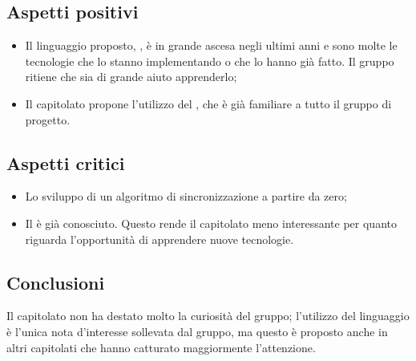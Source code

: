 \subsection{Aspetti positivi}
\begin{itemize}
\item Il linguaggio proposto, , è in grande ascesa negli ultimi anni e sono molte le tecnologie che lo stanno implementando o che lo hanno già fatto. Il gruppo ritiene che sia di grande aiuto apprenderlo;
\item Il capitolato propone l'utilizzo del  , che è già familiare a tutto il gruppo di progetto.
\end{itemize}

\subsection{Aspetti critici}
\begin{itemize}
\item Lo sviluppo di un algoritmo di sincronizzazione a partire da zero;
\item Il   è già conosciuto. Questo rende il capitolato meno interessante per quanto riguarda l'opportunità di apprendere nuove tecnologie.
\end{itemize}

\subsection{Conclusioni}
Il capitolato non ha destato molto la curiosità del gruppo; l'utilizzo del linguaggio  è l'unica nota d'interesse sollevata dal gruppo, ma questo è proposto anche in altri capitolati che hanno catturato maggiormente l'attenzione.